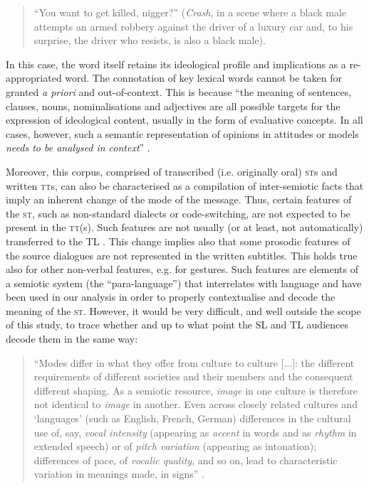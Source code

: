 \documentclass[output=paper]{LSP/langsci}
\begin{document}
\begin{quote}
 “You want to get killed, nigger?”\newline
\noindent (\textit{Crash}, in a scene where a black male attempts an armed robbery against the driver of a luxury car and, to his surprise, the driver who resists, is also a black male).
\end{quote}

In this case, the word itself retains its ideological profile and implications as a re-appropriated word. The connotation of key lexical words cannot be taken for granted \textit{a priori} and out-of-context. This is because “the meaning of sentences, clauses, nouns, nominalisations and adjectives are all possible targets for the expression of ideological content, usually in the form of evaluative concepts. In all cases, however, such a semantic representation of opinions in attitudes or models \textit{needs to be analysed in context}” \citep[260; our emphasis]{Dijk1995}.

Moreover, this corpus, comprised of transcribed (i.e. originally oral) \textsc{st}s and written \textsc{tt}s, can also be characterised as a compilation of inter-semiotic facts \citep{Jakobson2012} that imply an inherent change of the mode of the message. Thus, certain features of the \textsc{st}, such as non-standard dialects or code-switching, are not expected to be present in the \textsc{tt}(s). Such features are not usually (or at least, not automatically) transferred to the TL \citep[78]{Hatim1997}. This change implies also that some prosodic features of the source dialogues are not represented in the written subtitles. This holds true also for other non-verbal features, e.g. for gestures. Such features are elements of a semiotic system (the “para-language”) that interrelates with language \citep[32-42]{Halliday2014} and have been used in our analysis in order to properly contextualise and decode the meaning of the \textsc{st}. However, it would be very difficult, and well outside the scope of this study, to trace whether and up to what point the SL and TL audiences decode them in the same way:

\begin{quote}
“Modes differ in what they offer from culture to culture [...]: the different requirements of different societies and their members and the consequent different shaping. As a semiotic resource, \textit{image} in one culture is therefore not identical to \textit{image} in another. Even across closely related cultures and `languages' (such as English, French, German) differences in the cultural use of, say, \textit{vocal intensity} (appearing as \textit{accent} in words and as \textit{rhythm} in extended speech) or of \textit{pitch variation} (appearing as intonation); differences of pace, of \textit{vocalic quality}, and so on, lead to characteristic variation in meanings made, in signs” \citep[81; emphasis in the original]{Kress2010}.
\end{quote}
\end{document}
